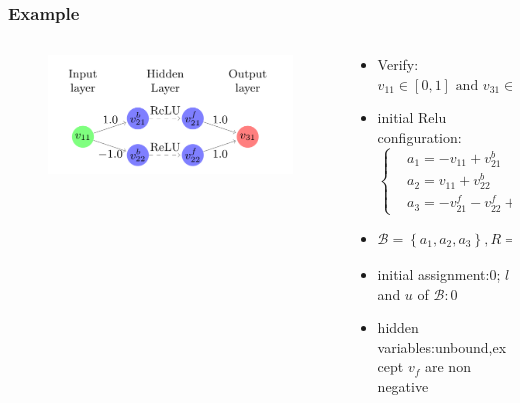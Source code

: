 \documentclass[aspectratio=169%
,serif,mathserif]{beamer}
\begin{document}
\begin{frame}
	\frametitle{Example}
	\begin{columns}
		\begin{column}{.5\textwidth}
			\begin{figure}[htbp]
				\includegraphics[width=1\linewidth]{4.png}
			\end{figure}
		\end{column}

		\begin{column}{.5\textwidth}
			\begin{itemize}
				\item Verify: $v_{11} \in[0,1] \text { and } v_{31} \in[0.5,1]$
				\item initial Relu configuration:
				\begin{equation}
					\left\{
						\begin{array}{lll}
						& a_{1}=-v_{11}+v_{21}^{b} \\
						& a_{2}=v_{11}+v_{22}^{b} \\
						& a_{3}=-v_{21}^{f}-v_{22}^{f}+v_{31}
					\end{array} \right.
				\end{equation}
				\item $\mathcal{B}=\left\{a_{1}, a_{2}, a_{3}\right\}, R = \left\{\left\langle v_{21}^{b}, v_{21}^{f}\right\rangle,\left\langle v_{22}^{b}, v_{22}^{f}\right\rangle\right\}$
				\item initial assignment:0; $l$ and $u$ of $\mathcal{B}:0$
				\item hidden variables:unbound,except $v_f$ are non negative
			\end{itemize}
		\end{column}
	\end{columns}
\end{frame}
\end{document}
